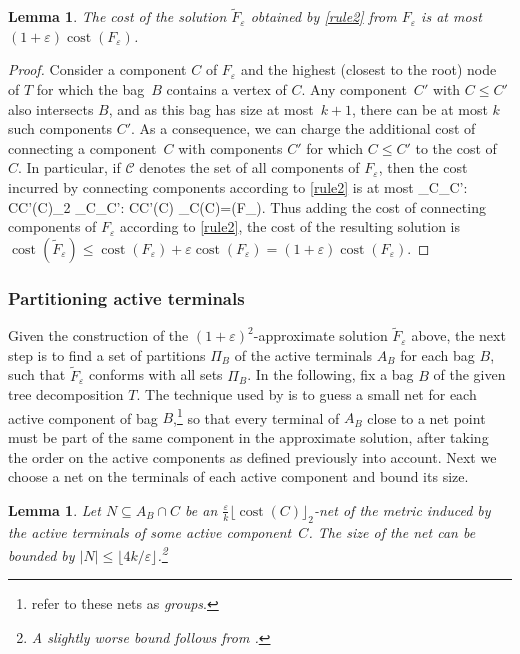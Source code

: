 \documentclass[a4paper]{article}
\let\oldcitet\citet
\renewcommand{\citet}[1]{\mbox{\oldcitet{#1}}}
\theoremstyle{plain}
\newtheorem{lemma}[theorem]{Lemma}%
\newcommand{\eps}{{\varepsilon}}
\def\[#1\]{\begin{doitall}#1\end{doitall}}
\DeclareMathOperator{\cost}{cost}
\newcommand{\pow}[1]{\lfloor #1\rfloor_{2}}
\begin{document}
\begin{lemma}\label{lem:near-opt-2} %
The cost of the solution $\widetilde{F}_\eps$ obtained by \autoref{rule2} from $F_\eps$ is at most $(1+\eps)\cost(F_\eps)$.
\end{lemma}

%
\begin{proof}%
Consider a component $C$ of $F_\eps$ and the highest (closest to the root) node of $T$ for which the bag~$B$ contains a vertex of $C$.
Any component~$C'$ with $C\leq C'$ also intersects $B$, and as this bag
has size at most~$k+1$, there can be at most $k$ such components $C'$.
As a consequence, we can charge the additional cost of connecting a component~$C$ with components $C'$ for which $C\leq C'$
to the cost of~$C$. In particular, if $\mathcal{C}$ denotes the set of all components of $F_\eps$, then
the cost incurred by connecting components according to \autoref{rule2} is at most
\[
\sum_{C\in{}}\sum_{C'\in{}: C\leq C'}\frac{\eps}{k}\pow{\cost(C)}\leq
\sum_{C\in{}}\sum_{C'\in{}: C\leq C'}\frac{\eps}{k}\cost(C)\leq
\sum_{C\in{}}\eps\cost(C)=\eps\cost(F_\eps).
\]
Thus adding the cost of connecting components of $F_\eps$ according to \autoref{rule2}, the cost of the resulting solution is $\cost(\widetilde{F}_\eps)\leq\cost(F_\eps)+\eps\cost(F_\eps)=(1+\eps)\cost(F_\eps)$.
\end{proof}    
%

\subsubsection{Partitioning active terminals}
\label{sec:partitions}

Given the construction of the $(1+\eps)^2$-approximate solution $\widetilde{F}_\eps$ above, the next step is to find a set of partitions $\Pi_B$
of the active terminals $A_B$ for each bag $B$, such that $\widetilde{F}_\eps$ conforms with all sets $\Pi_B$.
In the following, fix a bag $B$ of the given tree decomposition $T$.
The technique used by \citet{bateni2011approximation} is to guess a small net for each active component of bag $B$,\footnote{\citet{bateni2011approximation} refer to these nets as \emph{groups}.}
so that every terminal of $A_B$ close to a net point must be part of the same component in the approximate solution, 
after taking the order on the active components as defined previously into account.
Next we choose a net on the terminals of each active component and bound its size.

\begin{lemma}\label{lem:nets}%
Let $N\subseteq A_B\cap C$ be an $\frac{\eps}{k}\pow{\cost(C)}$-net of the metric induced by 
the active terminals of some active component~$C$.
The size of the net can be bounded by $|N|\leq\lfloor 4k/\eps\rfloor$.\footnote{A slightly worse bound follows from \cite[Lemma~19]{bateni2011approximation}.}
\end{lemma}
\end{document}
